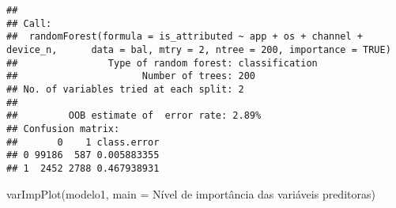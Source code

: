 \documentclass[
]{article}
\newenvironment{Shaded}{\begin{snugshade}}{\end{snugshade}}
\newcommand{\AttributeTok}[1]{\textcolor[rgb]{0.77,0.63,0.00}{#1}}
\newcommand{\ConstantTok}[1]{\textcolor[rgb]{0.00,0.00,0.00}{#1}}
\newcommand{\DecValTok}[1]{\textcolor[rgb]{0.00,0.00,0.81}{#1}}
\newcommand{\FunctionTok}[1]{\textcolor[rgb]{0.00,0.00,0.00}{#1}}
\newcommand{\NormalTok}[1]{#1}
\newcommand{\OtherTok}[1]{\textcolor[rgb]{0.56,0.35,0.01}{#1}}
\newcommand{\SpecialCharTok}[1]{\textcolor[rgb]{0.00,0.00,0.00}{#1}}
\newcommand{\StringTok}[1]{\textcolor[rgb]{0.31,0.60,0.02}{#1}}
\begin{document}
\begin{Shaded}
\end{Shaded}

\begin{verbatim}
## 
## Call:
##  randomForest(formula = is_attributed ~ app + os + channel + device_n,      data = bal, mtry = 2, ntree = 200, importance = TRUE) 
##                Type of random forest: classification
##                      Number of trees: 200
## No. of variables tried at each split: 2
## 
##         OOB estimate of  error rate: 2.89%
## Confusion matrix:
##       0    1 class.error
## 0 99186  587 0.005883355
## 1  2452 2788 0.467938931
\end{verbatim}

\begin{Shaded}
\begin{Highlighting}[]
\FunctionTok{varImpPlot}\NormalTok{(modelo1, }\AttributeTok{main =} \StringTok{\textquotesingle{}Nível de importância das variáveis preditoras\textquotesingle{}}\NormalTok{)}
\end{Highlighting}
\end{Shaded}
\end{document}
